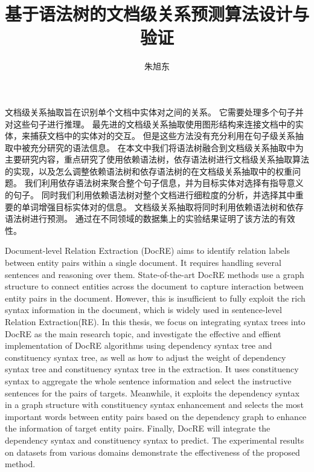 \documentclass[bachelor]{thesis-uestc}
\title{基于语法树的文档级关系预测算法设计与验证}{Design and Verification of Document-level Relation Extraction Algorithm Based on Syntax Tree}
\author{朱旭东}{Xudong Zhu}
\begin{document}
\makecover

\begin{chineseabstract}
    文档级关系抽取旨在识别单个文档中实体对之间的关系。
    它需要处理多个句子并对这些句子进行推理。
    最先进的文档级关系抽取使用图形结构来连接文档中的实体，来捕获文档中的实体对的交互。
    但是这些方法没有充分利用在句子级关系抽取中被充分研究的语法信息。
    在本文中我们将语法树融合到文档级关系抽取中为主要研究内容，重点研究了使用依赖语法树，依存语法树进行文档级关系抽取算法的实现，以及怎么调整依赖语法树和依存语法树的在文档级关系抽取中的权重问题。
    我们利用依存语法树来聚合整个句子信息，并为目标实体对选择有指导意义的句子。
    同时我们利用依赖语法树对整个文档进行细粒度的分析，并选择其中重要的单词增强目标实体对的信息。
    文档级关系抽取将同时利用依赖语法树和依存语法树进行预测。
    通过在不同领域的数据集上的实验结果证明了该方法的有效性。


\end{chineseabstract}

\begin{englishabstract}
    Document-level Relation Extraction (DocRE) aims to identify relation labels between entity pairs within a single document.
    It requires handling several sentences and reasoning over them.
    State-of-the-art DocRE methods use a graph structure to connect entities across the document to capture interaction between entity pairs in the document.
    However, this is insufficient to fully exploit the rich syntax information in the document, which is widely used in sentence-level Relation Extraction(RE).
    In this thesis, we focus on integrating syntax trees into DocRE as the main research topic, and investigate the effective and effient implementation of DocRE algorithms using dependency syntax tree and constituency syntax tree, as well as how to adjust the weight of dependency syntax tree and constituency syntax tree in the extraction.
    It uses constituency syntax to aggregate the whole sentence information and select the instructive sentences for the pairs of targets.
    Meanwhile, it exploits the dependency syntax in a graph structure with constituency syntax enhancement and selects the most important words between entity pairs based on the dependency graph to enhance the information of target entity pairs.
    Finally, DocRE will integrate the dependency syntax and constituency syntax to predict.
    The experimental results on datasets from various domains demonstrate the effectiveness of the proposed method.


\end{englishabstract}
\end{document}
